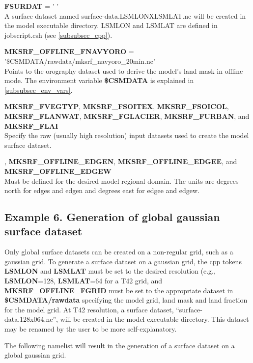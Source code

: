 \medskip \noindent 
{\bf FSURDAT} = ' ' \\ 
A surface dataset named surface-data.LSMLONXLSMLAT.nc will be created
in the model executable directory. LSMLON and LSMLAT are defined in
jobscript.csh (see \ref{subsubsec_cpp}).

\medskip \noindent
{\bf MKSRF\_OFFLINE\_FNAVYORO} = '\$CSMDATA/rawdata/mksrf\_navyoro\_20min.nc'\\ 
Points to the orography dataset used to derive the model's land mask
in offline mode.  The environment variable {\bf \$CSMDATA} is
explained in \ref{subsubsec_env_vars}.

\medskip \noindent 
{\bf MKSRF\_FVEGTYP}, {\bf MKSRF\_FSOITEX}, {\bf MKSRF\_FSOICOL}, {\bf
MKSRF\_FLANWAT}, {\bf MKSRF\_FGLACIER}, {\bf MKSRF\_FURBAN}, and {\bf
MKSRF\_FLAI} \\ 
Specify the raw (usually high resolution) input datasets used to
create the model surface dataset.

\medskip {}, {\bf MKSRF\_OFFLINE\_EDGEN}, {\bf
MKSRF\_OFFLINE\_EDGEE}, and {\bf MKSRF\_OFFLINE\_EDGEW} \\ 
Must be defined for the desired model regional domain.  The units are
degrees north for edges and edgen and degrees east for edgee and
edgew.

\subsection {Example 6. Generation of global gaussian surface dataset}

\medskip \noindent  
Only global surface datasets can be created on a non-regular grid,
such as a gaussian grid. To generate a surface dataset on a gaussian
grid, the cpp tokens {\bf LSMLON} and {\bf LSMLAT} must be set to the
desired resolution (e.g., {\bf LSMLON}=128, {\bf LSMLAT}=64 for a T42
grid, and {\bf MKSRF\_OFFLINE\_FGRID} must be set to the appropriate
dataset in {\bf \$CSMDATA/rawdata} specifying the model grid, land
mask and land fraction for the model grid. At T42 resolution, a
surface dataset, ``surface-data.128x064.nc'', will be created in the
model executable directory. This dataset may be renamed by the user to
be more self-explanatory.

\medskip \noindent 
The following namelist will result in the generation of a surface
dataset on a global gaussian grid.

